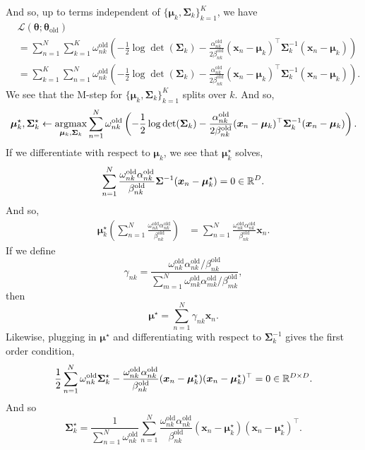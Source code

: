 \begin{enumerate}[label = (\alph*)]
    And so, up to terms independent of $\{\bm{\mu}_k,\bm{\Sigma}_k\}_{k=1}^K$, we have
    \begin{align*}
        &\mathcal{L}(\bm{\theta};\bm{\theta}_{\mathrm{old}})\\
        &=\sum_{n=1}^N\sum_{k=1}^K  \omega_{nk}^{\mathrm{old}}\left(-\frac{1}{2}\log \det(\bm{\Sigma}_k) - \frac{\alpha_{nk}^{\mathrm{old}}}{2\beta_{nk}^{\mathrm{old}}}(\bm{x}_n - \bm{\mu}_k)^\top \bm{\Sigma}_k^{-1}(\bm{x}_n - \bm{\mu}_k) \right)\\
        &=\sum_{k=1}^K\sum_{n=1}^N \omega_{nk}^{\mathrm{old}}\left(-\frac{1}{2}\log \det(\bm{\Sigma}_k) - \frac{\alpha_{nk}^{\mathrm{old}}}{2\beta_{nk}^{\mathrm{old}}}(\bm{x}_n - \bm{\mu}_k)^\top \bm{\Sigma}_k^{-1}(\bm{x}_n - \bm{\mu}_k) \right).
    \end{align*}
    We see that the M-step for $\{\bm{\mu}_k,\bm{\Sigma}_k\}_{k=1}^K$ splits over $k$. And so,
    \[\bm{\mu}_k^\star,\bm{\Sigma}_k^\star \gets \operatorname*{argmax}_{\bm{\mu}_k,\bm{\Sigma}_k} \sum_{n=1}^N \omega_{nk}^{\mathrm{old}}\left(-\frac{1}{2}\log \det(\bm{\Sigma}_k) - \frac{\alpha_{nk}^{\mathrm{old}}}{2\beta_{nk}^{\mathrm{old}}}(\bm{x}_n - \bm{\mu}_k)^\top \bm{\Sigma}_k^{-1}(\bm{x}_n - \bm{\mu}_k) \right). \]
    If we differentiate with respect to $\bm{\mu}_k$, we see that $\bm{\mu}_k^\star$ solves,
    \[\sum_{n=1}^N \frac{\omega_{nk}^{\mathrm{old}}\alpha_{nk}^{\mathrm{old}}}{\beta_{nk}^{\mathrm{old}}}\bm{\Sigma}^{-1} (\bm{x}_n-\bm{\mu}_k^\star)=0\in \mathbb{R}^D. \]
    And so,
    \begin{align*}
       \bm{\mu}_k^\star \left(\sum_{n=1}^N \frac{\omega_{nk}^{\mathrm{old}}\alpha_{nk}^{\mathrm{old}}}{\beta_{nk}^{\mathrm{old}}}\right) &= \sum_{n=1}^N \frac{\omega_{nk}^{\mathrm{old}}\alpha_{nk}^{\mathrm{old}}}{\beta_{nk}^{\mathrm{old}}} \bm{x}_n.
    \end{align*}
    If we define 
    \[\gamma_{nk} = \frac{\omega_{nk}^{\mathrm{old}}\alpha_{nk}^{\mathrm{old}}/\beta_{nk}^{\mathrm{old}}}{\sum_{m=1}^N \omega_{mk}^{\mathrm{old}}\alpha_{mk}^{\mathrm{old}}/\beta_{mk}^{\mathrm{old}}}, \]
    then 
    \[ \bm{\mu}^\star = \sum_{n=1}^N \gamma_{nk} \bm{x}_n.\]
    Likewise, plugging in $\bm{\mu}^\star$ and differentiating with respect to $\bm{\Sigma}_k^{-1}$ gives the first order condition,
    \[\frac{1}{2}\sum_{n=1}^N \omega_{nk}^{\text{old}}\bm{\Sigma}_k^\star - \frac{\omega_{nk}^{\mathrm{old}}\alpha_{nk}^{\mathrm{old}}}{\beta_{nk}^{\mathrm{old}}}(\bm{x}_n-\bm{\mu}_k^\star)(\bm{x}_n - \bm{\mu}_k^\star)^\top = 0 \in \mathbb{R}^{D \times D}. \]
    And so
    \[\bm{\Sigma}_k^\star = \frac{1}{\sum_{n=1}^N \omega_{nk}^\text{old}} \sum_{n=1}^N \frac{\omega_{nk}^{\mathrm{old}}\alpha_{nk}^{\mathrm{old}}}{\beta_{nk}^{\mathrm{old}}}(\bm{x}_n-\bm{\mu}_k^\star)(\bm{x}_n - \bm{\mu}_k^\star)^\top.  \]
\end{enumerate}
